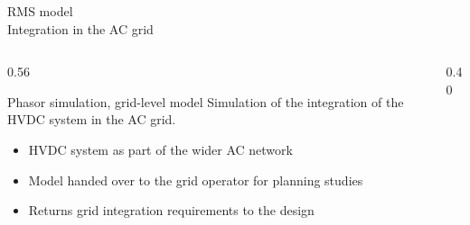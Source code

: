 \begin{frame}{RMS model\\Integration in the AC grid}
  \begin{columns}[T,onlytextwidth]
    \begin{column}{0.56\textwidth}
      \begin{block}{Phasor simulation, grid-level model}
        Simulation of the integration of the HVDC system in the AC grid.
      \end{block}
      \begin{itemize}
        \setlength{\itemsep}{0.4em}
        \item HVDC system as part of the wider AC network
        \item Model handed over to the grid operator for planning studies
        \item Returns grid integration requirements to the design
      \end{itemize}
    \end{column}
    \begin{column}{0.40\textwidth}
    \end{column}
  \end{columns}
\end{frame}
